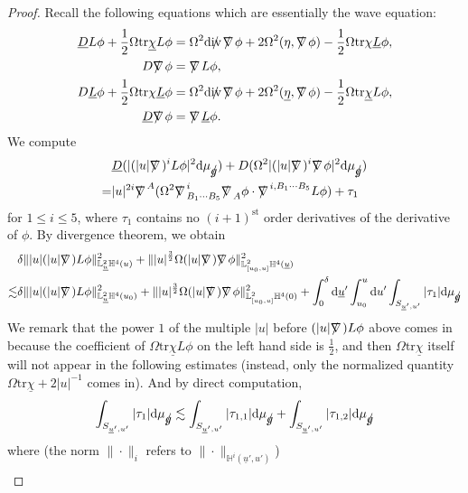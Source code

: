 \documentclass[11pt,reqno]{amsart}
\theoremstyle{definition}
\numberwithin{equation}{section}
\newcommand{\D}{\mathrm{d}}
\newcommand{\tr}{\mathrm{tr}}
\renewcommand{\L}{\mathbb{L}}
\renewcommand{\H}{\mathbb{H}}
\def\chib{\underline{\chi}}
\def\etab{\underline{\eta}}
\def\Lb{\underline{L}}
\def\tr{\mathrm{tr}}
\def\ub{\underline{u}}
\newcommand{\Db}{\underline{D}}
\def\nablas{\mbox{$\nabla \mkern -13mu /$ }}
\def\divs{\mbox{$\mathrm{div} \mkern -13mu /$ }}
\def\gs{\mbox{$g \mkern -9mu /$}}
\begin{document}
\begin{proof}
Recall the following equations which are essentially the wave equation:
\begin{equation}\label{equ-wave}
\begin{split}
\Db L\phi+\frac{1}{2}\Omega\tr\chib L\phi&=\Omega^2\divs\nablas\phi+2\Omega^2(\eta,\nablas\phi)-\frac{1}{2}\Omega\tr\chi\Lb\phi,\\
D\nablas\phi&=\nablas L\phi,\\
D\Lb\phi+\frac{1}{2}\Omega\tr\chi\Lb\phi&=\Omega^2\divs\nablas\phi+2\Omega^2(\etab,\nablas\phi)-\frac{1}{2}\Omega\tr\chib L\phi,\\
\Db\nablas\phi&=\nablas\Lb\phi.
\end{split}
\end{equation}
We compute
\begin{align*}
&\Db(|(|u|\nablas)^iL\phi|^2\D\mu_{\gs})+D(\Omega^2|(|u|\nablas)^i\nablas\phi|^2\D\mu_{\gs})\\
=&|u|^{2i}\nablas^A(\Omega^2\nablas^i_{B_1\cdots B_5}\nablas_A\phi\cdot\nablas^{i,B_1\cdots B_5}L\phi)+\tau_1
\end{align*}
for $1\le i\le 5$, where $\tau_1$ contains no $(i+1)^{\text{st}}$ order derivatives of the derivative of $\phi$. By divergence theorem, we obtain
\begin{align*}
&\delta\||u|(|u|\nablas)L\phi\|_{\L^2_{\ub}\H^4(u)}^2+\||u|^{\frac{3}{2}}\Omega(|u|\nablas)\nablas\phi\|_{\L^2_{[u_0,u]}\H^4(\ub)}^2\\
\lesssim&\delta\||u|(|u|\nablas)L\phi\|_{\L^2_{\ub}\H^4(u_0)}^2+\||u|^{\frac{3}{2}}\Omega(|u|\nablas)\nablas\phi\|_{\L^2_{[u_0,u]}\H^4(0)}^2+\int_0^{\delta}\D\ub'\int_{u_0}^u\D u'\int_{S_{\ub',u'}}|\tau_1|\D\mu_{\gs}
\end{align*}
We remark that the power $1$ of the multiple $|u|$ before $(|u|\nablas)L\phi$ above comes in because the coefficient of $\Omega\tr\chib L\phi$ on the left hand side is $\frac{1}{2}$, and then $\Omega\tr\chib$ itself will not appear in the following estimates (instead, only the normalized quantity $\Omega\tr\chib+2|u|^{-1}$ comes in). And by direct computation, 
\begin{align*}
\int_{S_{\ub',u'}}|\tau_1|\D\mu_{\gs}\lesssim\int_{S_{\ub',u'}}|\tau_{1,1}|\D\mu_{\gs}+\int_{S_{\ub',u'}}|\tau_{1,2}|\D\mu_{\gs}
\end{align*}
where (the norm $\|\cdot\|_i$ refers to $\|\cdot\|_{\H^i(\ub',u')}$)
\begin{equation}\label{tau11}
\begin{split}

\end{split}
\end{equation}
\end{proof}
\end{document}
